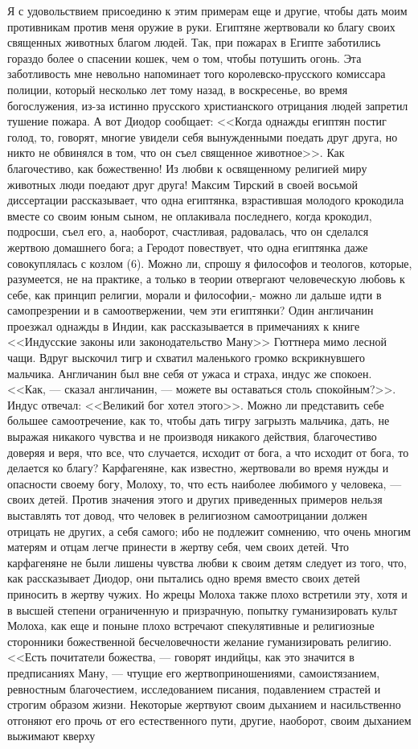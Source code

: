 \documentclass[12pt]{article}
\begin{document}
Я с удовольствием присоединю к этим примерам еще и другие, чтобы дать моим противникам против меня оружие в руки. Египтяне жертвовали ко благу своих священных животных благом людей. Так, при пожарах в Египте заботились гораздо более о спасении кошек, чем о том, чтобы потушить огонь. Эта заботливость мне невольно напоминает того королевско-прусского комиссара полиции, который несколько лет тому назад, в воскресенье, во время богослужения, из-за истинно прусского христианского отрицания людей запретил тушение пожара. А вот Диодор сообщает: <<Когда однажды египтян постиг голод, то, говорят, многие увидели себя вынужденными поедать друг друга, но никто не обвинялся в том, что он съел священное животное>>. Как благочестиво, как божественно! Из любви к освященному религией миру животных люди поедают друг друга! Максим Тирский в своей восьмой диссертации рассказывает, что одна египтянка, взрастившая молодого крокодила вместе со своим юным сыном, не оплакивала последнего, когда крокодил, подросши, съел его, а, наоборот, счастливая, радовалась, что он сделался жертвою домашнего бога; а Геродот повествует, что одна египтянка даже совокуплялась с козлом (6). Можно ли, спрошу я философов и теологов, которые, разумеется, не на практике, а только в теории отвергают человеческую любовь к себе, как принцип религии, морали и философии,- можно ли дальше идти в самопрезрении и в самоотвержении, чем эти египтянки? Один англичанин проезжал однажды в Индии, как рассказывается в примечаниях к книге <<Индусские законы или законодательство Ману>> Гюттнера мимо лесной чащи. Вдруг выскочил тигр и схватил маленького громко вскрикнувшего мальчика. Англичанин был вне себя от ужаса и страха, индус же спокоен. <<Как, --- сказал англичанин, --- можете вы оставаться столь спокойным?>>. Индус отвечал: <<Великий бог хотел этого>>. Можно ли представить себе большее самоотречение, как то, чтобы дать тигру загрызть мальчика, дать, не выражая никакого чувства и не производя никакого действия, благочестиво доверяя и веря, что все, что случается, исходит от бога, а что исходит от бога, то делается ко благу? Карфагеняне, как известно, жертвовали во время нужды и опасности своему богу, Молоху, то, что есть наиболее любимого у человека, --- своих детей. Против значения этого и других приведенных примеров нельзя выставлять тот довод, что человек в религиозном самоотрицании должен отрицать не других, а себя самого; ибо не подлежит сомнению, что очень многим матерям и отцам легче принести в жертву себя, чем своих детей. Что карфагеняне не были лишены чувства любви к своим детям следует из того, что, как рассказывает Диодор, они пытались одно время вместо своих детей приносить в жертву чужих. Но жрецы Молоха также плохо встретили эту, хотя и в высшей степени ограниченную и призрачную, попытку гуманизировать культ Молоха, как еще и поныне плохо встречают спекулятивные и религиозные сторонники божественной бесчеловечности желание гуманизировать религию. <<Есть почитатели божества, --- говорят индийцы, как это значится в предписаниях Ману, --- чтущие его жертвоприношениями, самоистязанием, ревностным благочестием, исследованием писания, подавлением страстей и строгим образом жизни. Некоторые жертвуют своим дыханием и насильственно отгоняют его прочь от его естественного пути, другие, наоборот, своим дыханием выжимают кверху 
\end{document}
